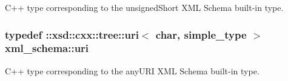 C++ type corresponding to the unsigned\-Short X\-M\-L Schema built-\/in type. 

\hypertarget{namespacexml__schema_a2518fddf119bd258d7443408863ee457}{
\subsubsection[{uri}]{\setlength{\rightskip}{0pt plus 5cm}typedef \-::xsd\-::cxx\-::tree\-::uri$<$ char, {\bf simple\-\_\-type} $>$ {\bf xml\-\_\-schema\-::uri}}}\label{namespacexml__schema_a2518fddf119bd258d7443408863ee457}


C++ type corresponding to the any\-U\-R\-I X\-M\-L Schema built-\/in type. 

